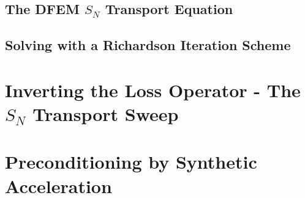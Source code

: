 \documentclass[preprint,review,12pt]{elsarticle}
\begin{document}
\subsection{The DFEM $S_N$ Transport Equation} \label{sec::trans_DFEMSn}



\subsection{Solving with a Richardson Iteration Scheme} \label{sec::trans_SI}


\section{Inverting the Loss Operator - The $S_N$ Transport Sweep} \label{sec::sweep}



\section{Preconditioning by Synthetic Acceleration} \label{sec::accel}

\end{document}
